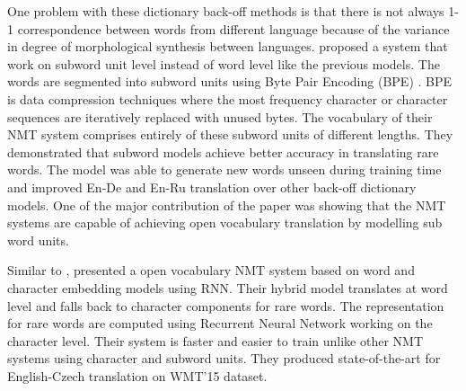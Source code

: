 One problem with these dictionary back-off methods is that there is not always 1-1 correspondence between words from different language because of the variance in degree of morphological synthesis between languages. \cite{sennrich2015neural} proposed a system that work on subword unit level instead of word level like the previous models. The words are segmented into subword units using Byte Pair Encoding (BPE) \citep{gage1994new}. BPE is data compression techniques where the most frequency character or character sequences are iteratively replaced with unused bytes. The vocabulary of their NMT system comprises entirely of these subword units of different lengths. They demonstrated that subword models achieve better accuracy in translating rare words. The model was able to generate new words unseen during training time and improved En-De and En-Ru translation over other back-off dictionary models. One of the major contribution of the paper was showing that the NMT systems are capable of achieving open vocabulary translation by modelling sub word units.

Similar to \cite{sennrich2015neural}, \cite{luong2016achieving} presented a open vocabulary NMT system based on word and character embedding models using RNN. Their hybrid model translates at word level and falls back to character components for rare words. The representation for rare words are computed using Recurrent Neural Network working on the character level. Their system is faster and easier to train unlike other NMT systems using character and subword units. They produced state-of-the-art for English-Czech translation on WMT'15 dataset.


